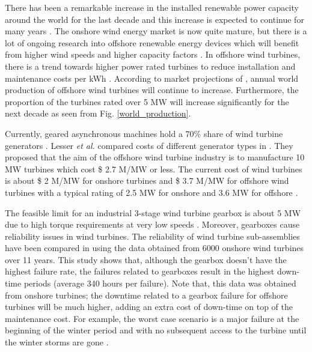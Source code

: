 \documentclass[12pt]{iopart}
\begin{document}
There has been a remarkable increase in the installed renewable power capacity around the world for the last decade and this increase is expected to continue for many years \cite{Tong2010}. The onshore wind energy market is now quite mature, but there is a lot of ongoing research into offshore renewable energy devices which will benefit from higher wind speeds and higher capacity factors \cite{Tong2010}.  In offshore wind turbines, there is a trend towards higher power rated turbines to reduce installation and maintenance costs per kWh \cite{Bang2008}. According to market projections of \cite{offshore_wind_report2009}, annual world production of offshore wind turbines will continue to increase. Furthermore, the proportion of  the turbines rated over 5 MW will increase significantly for the next decade as seen from Fig. \ref{world_production}.

Currently, geared asynchronous machines hold a 70\% share of wind turbine generators \cite{Lesser2009}. Lesser \textit{et al.} compared costs of different generator types in \cite{Lesser2009}. They proposed that the aim of the offshore wind turbine industry is to manufacture 10 MW  turbines which cost \$ 2.7 M/MW or less. The current cost of wind turbines is about \$ 2 M/MW for onshore turbines and \$ 3.7 M/MW for offshore wind turbines with a typical rating of 2.5 MW for onshore and 3.6 MW for offshore \cite{Lesser2009}.

The feasible limit for an industrial 3-stage wind turbine gearbox is about 5 MW due to high torque requirements at very low speeds \cite{Lesser2009}. Moreover, gearboxes cause reliability issues in wind turbines. The reliability of wind turbine sub-assemblies have been compared in \cite{Spinato2009} using the data obtained from 6000 onshore wind turbines over 11 years. This study shows that, although the gearbox doesn't have the highest failure rate, the failures related to gearboxes result in the highest down-time periods (average 340 hours per failure). Note that, this data was obtained from onshore turbines; the downtime related to a gearbox failure for offshore turbines will be much higher, adding an extra cost of down-time on top of the maintenance cost. For example, the worst case scenario is a major failure at the beginning of the winter period and with no subsequent access to the turbine until the winter storms are gone \cite{Abrahamsen2010}.
\end{document}
